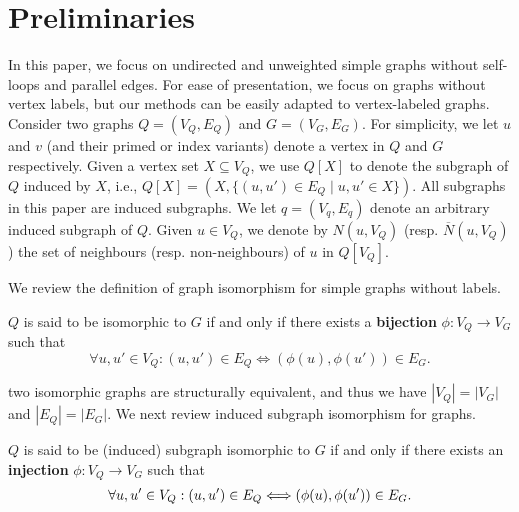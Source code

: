 \section{Preliminaries}
\label{sec:preli}
In this paper, we focus on undirected and unweighted simple {\cheng graphs} without self-loops and parallel edges. {\cheng For ease of presentation, we focus on  graphs without vertex labels, but} 
our methods  can be easily adapted to vertex-labeled graphs. Consider two graphs $Q=(V_Q,E_Q)$ and $G=(V_G,E_G)$. For simplicity, we let $u$ and $v$ (and their primed or index variants) denote a vertex in $Q$ and $G$ respectively. Given a vertex set $X\subseteq V_Q$, we use $Q[X]$ to denote the subgraph of $Q$ induced by $X$, i.e., $Q[X]=(X,\{(u,u')\in E_Q \mid u, u'\in X\})$. All subgraphs in this paper are induced subgraphs. We let $q = (V_q, E_q)$ denote an arbitrary induced subgraph of $Q$. 
%
Given $u\in V_Q$, we denote by $N(u,V_Q)$ (resp. $\overline{N}(u,V_Q)$) the set of neighbours (resp. non-neighbours) of $u$ in $Q[V_Q]$.     

We  review the definition of graph isomorphism for  simple graphs without labels.

\begin{definition}
    \label{def:GS}
    $Q$ is said to be isomorphic to $G$ if and only if there exists a \textbf{bijection} $\phi: V_Q\rightarrow V_G$ such that
    \begin{equation}
    \label{eq:isomorphic}
        \forall u, u' \in V_Q: (u,u')\in E_Q \iff (\phi(u),\phi(u'))\in E_G.
    \end{equation}
\end{definition}

 two isomorphic graphs are structurally equivalent, {\chengC and thus we have} $|V_Q|=|V_G|$ and $|E_Q|=|E_G|$. We next review induced subgraph isomorphism for  graphs. 

\begin{definition}
    $Q$ is said to be (induced) subgraph isomorphic to $G$ if and only if there exists an \textbf{injection} $\phi: V_Q\rightarrow V_G$ such that
    \begin{equation}
        \forall u, u' \in V_Q: (u,u')\in E_Q {\YuiR \iff} (\phi(u),\phi(u'))\in E_G. %
    \end{equation}
\end{definition}

